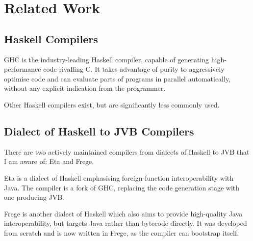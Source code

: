 \documentclass[dissertation.tex]{subfiles}
\begin{document}
\section{Related Work}
{
    \subsection{Haskell Compilers}
    {

        GHC is the industry-leading Haskell compiler, capable of generating high-performance code rivalling C. It takes
        advantage of purity to aggressively optimise code and can evaluate parts of programs in parallel automatically,
        without any explicit indication from the programmer.

        Other Haskell compilers exist, but are significantly less commonly used.

    }
    \subsection{Dialect of Haskell to JVB Compilers}
    {

        There are two actively maintained compilers from dialects of Haskell to JVB that I am aware of: Eta and Frege.


        Eta is a dialect of Haskell emphasising foreign-function interoperability with Java. The 
        compiler is a fork of GHC, replacing the code generation stage with one producing JVB.

        Frege is another dialect of Haskell which also aims to provide high-quality Java interoperability, but targets
        Java rather than bytecode directly. It was developed from scratch and is now written in Frege, as the compiler
        can bootstrap itself.

    }
}
\end{document}
